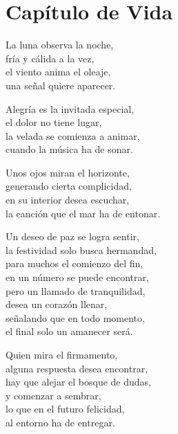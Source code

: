 \section*{Capítulo de Vida}
\label{CapituloVida}

\vspace{1em}
\begin{center}
La luna observa la noche,\\ 
fría y cálida a la vez,\\ 
el viento anima el oleaje,\\ 
una señal quiere aparecer.

\vspace{1em} 
Alegría es la invitada especial,\\ 
el dolor no tiene lugar,\\ 
la velada se comienza a animar,\\ 
cuando la música ha de sonar.

\vspace{1em} 
Unos ojos miran el horizonte,\\ 
generando cierta complicidad,\\ 
en su interior desea escuchar,\\ 
la canción que el mar ha de entonar.

\vspace{1em} 
Un deseo de paz se logra sentir,\\ 
la festividad solo busca hermandad,\\ 
para muchos el comienzo del fin,\\ 
en un número se puede encontrar,\\ 
pero un llamado de tranquilidad,\\ 
desea un corazón llenar,\\ 
señalando que en todo momento,\\ 
el final solo un amanecer será.

\vspace{1em} 
Quien mira el firmamento,\\ 
alguna respuesta desea encontrar,\\ 
hay que alejar el bosque de dudas,\\ 
y comenzar a sembrar,\\ 
lo que en el futuro felicidad,\\ 
al entorno ha de entregar.


\end{center}
